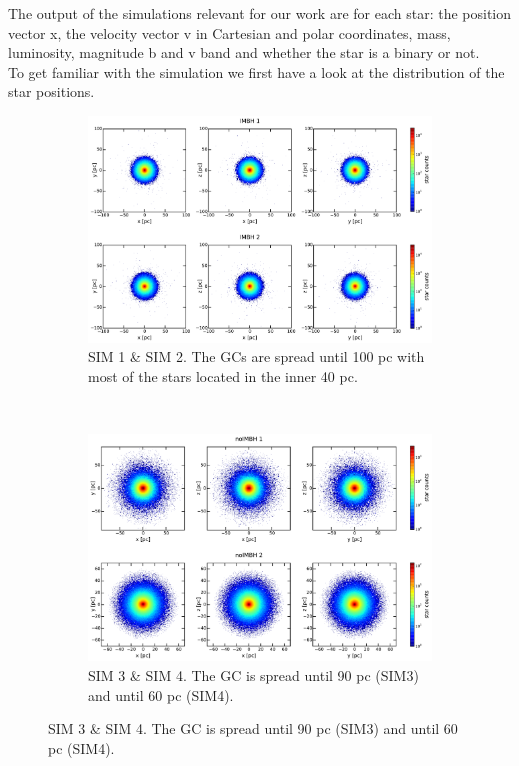The output of the simulations relevant for our work are for each star: the position
vector x, the velocity vector v in Cartesian and polar coordinates, mass, luminosity, magnitude b and v band and whether
the star is a binary or not.
\\
To get familiar with the simulation we first have a look at the distribution of the star positions.
\begin{figure}[htbp] 
\centering
\begin{subfigure}{0.9\textwidth}
	\centering
  	\includegraphics[width=\textwidth]{Plots/position_scatter_plot_IMBH.pdf}
  	\caption{SIM 1 \& SIM 2. The \acp{GC} are spread until 100 pc with most of the stars located in the inner 40 pc.}
 	\label{fig:pos_scat_IMBH}
\end{subfigure}
\\
\begin{subfigure}{0.9\textwidth}
	\centering
  	\includegraphics[width=\textwidth]{Plots/position_scatter_plot_noIMBH.pdf}
  	\caption{SIM 3 \& SIM 4. The \ac{GC} is spread until 90 pc (SIM3) and until 60 pc (SIM4).}
 	\label{fig:pos_scat_noIMBH}
\end{subfigure}


\end{figure}
